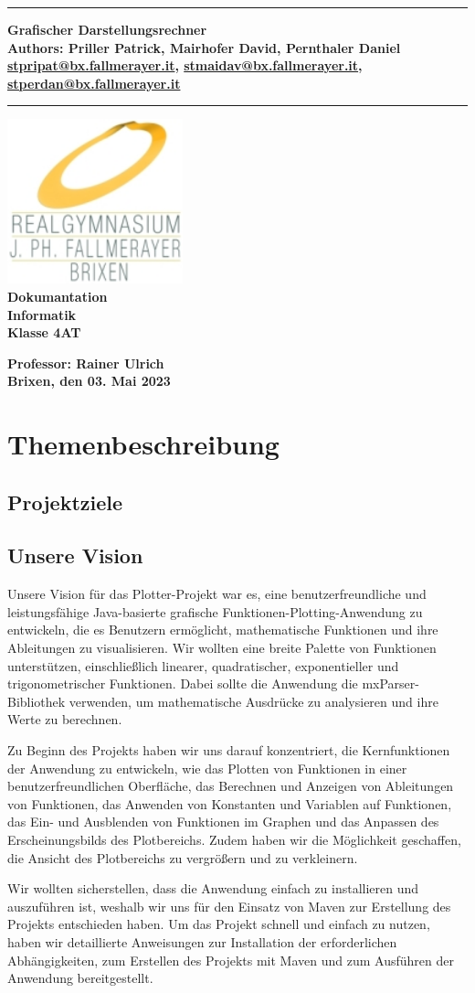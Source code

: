 \documentclass[a4paper]{article}
\newcommand{\CustomTitle}[9]{
    \thispagestyle{empty}
    \vspace*{\stretch{1}}
    {\parindent0cm \rule{\linewidth}{.7ex}}
    \begin{flushright}
        \vspace*{\stretch{1}}
        \sffamily\bfseries\huge
        #1\\
        \vspace*{\stretch{1}}
        \sffamily\bfseries\small
        #2\\
        \vspace*{\stretch{1}}
        \sffamily\bfseries\small
        #3
    \end{flushright}
    \rule{\linewidth}{.7ex}

    \vspace*{\stretch{1}}
    \begin{center}
        \includegraphics[width=2in]{Resources/Logo.png} \\
        \vspace*{\stretch{1}}
        \textbf{\Large Dokumantation}\\

        \vspace*{\stretch{2}}
        \textbf{\large Informatik}\\
        \textbf{\large Klasse 4AT}

        \vspace*{\stretch{1}}
        \textbf{\large Professor: Rainer Ulrich}  \\[1mm]

        \vspace*{\stretch{1}}
        \textbf{\large Brixen, den 03. Mai 2023}\\
        \vspace*{\stretch{0.25}}
    \end{center}
}
\begin{document}
\CustomTitle
{Grafischer Darstellungsrechner}
{Authors: Priller Patrick, Mairhofer David, Pernthaler Daniel}
{\href{mailto:stpripat@bx.fallmerayer.it}{stpripat@bx.fallmerayer.it}, \href{mailto:stmaidav@bx.fallmerayer.it}{stmaidav@bx.fallmerayer.it}, \href{mailto:stperdan@bx.fallmayer.it}{stperdan@bx.fallmerayer.it}}

{Oberschulzentrum J. Ph. Fallmerayer}
{Brixen}
{\today}
{Rainer Ulrich}
{}

\clearpage

\lhead{}
\setcounter{page}{1}
\tableofcontents

\clearpage

\section{Themenbeschreibung}

\subsection{Projektziele}

\subsection{Unsere Vision}
Unsere Vision für das Plotter-Projekt war es, eine benutzerfreundliche und leistungsfähige Java-basierte grafische Funktionen-Plotting-Anwendung zu entwickeln, die es Benutzern ermöglicht, mathematische Funktionen und ihre Ableitungen zu visualisieren. Wir wollten eine breite Palette von Funktionen unterstützen, einschließlich linearer, quadratischer, exponentieller und trigonometrischer Funktionen. Dabei sollte die Anwendung die mxParser-Bibliothek verwenden, um mathematische Ausdrücke zu analysieren und ihre Werte zu berechnen.

Zu Beginn des Projekts haben wir uns darauf konzentriert, die Kernfunktionen der Anwendung zu entwickeln, wie das Plotten von Funktionen in einer benutzerfreundlichen Oberfläche, das Berechnen und Anzeigen von Ableitungen von Funktionen, das Anwenden von Konstanten und Variablen auf Funktionen, das Ein- und Ausblenden von Funktionen im Graphen und das Anpassen des Erscheinungsbilds des Plotbereichs. Zudem haben wir die Möglichkeit geschaffen, die Ansicht des Plotbereichs zu vergrößern und zu verkleinern.

Wir wollten sicherstellen, dass die Anwendung einfach zu installieren und auszuführen ist, weshalb wir uns für den Einsatz von Maven zur Erstellung des Projekts entschieden haben. Um das Projekt schnell und einfach zu nutzen, haben wir detaillierte Anweisungen zur Installation der erforderlichen Abhängigkeiten, zum Erstellen des Projekts mit Maven und zum Ausführen der Anwendung bereitgestellt.
\end{document}

